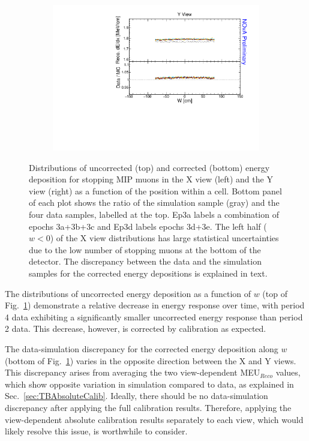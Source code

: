 \begin{figure}[!ht]
\begin{subfigure}{0.495\textwidth}
  \end{subfigure}
  \begin{subfigure}{0.495\textwidth}
    \includegraphics[width=\linewidth]{Plots/Calibana/recomevcm_w_y.pdf}
  \end{subfigure}
  \caption[Validation plots for stopping muons along w]{Distributions of uncorrected (top) and corrected (bottom) energy deposition for stopping \acrshort{MIP} muons in the X view (left) and the Y view (right) as a function of the position within a cell. Bottom panel of each plot shows the ratio of the simulation sample (gray) and the four data samples, labelled at the top. Ep3a labels a combination of epochs 3a+3b+3c and Ep3d labels epochs 3d+3e. The left half ($w<0$) of the X view distributions has large statistical uncertainties due to the low number of stopping muons at the bottom of the detector. The discrepancy between the data and the simulation samples for the corrected energy depositions is explained in text.}
  \label{fig:AbsCalibW1}
\end{figure}

The distributions of uncorrected energy deposition as a function of $w$ (top of Fig.~\ref{fig:AbsCalibW1}) demonstrate a relative decrease in energy response over time, with period 4 data exhibiting a significantly smaller uncorrected energy response than period 2 data. This decrease, however, is corrected by calibration as expected.

The data-simulation discrepancy for the corrected energy deposition along $w$ (bottom of Fig.~\ref{fig:AbsCalibW1}) varies in the opposite direction between the X and Y views. This discrepancy arises from averaging the two view-dependent \gls{MEU}$_{Reco}$ values, which show opposite variation in simulation compared to data, as explained in Sec.~\ref{sec:TBAbsoluteCalib}. Ideally, there should be no data-simulation discrepancy after applying the full calibration results. Therefore, applying the view-dependent absolute calibration results separately to each view, which would likely resolve this issue, is worthwhile to consider.

